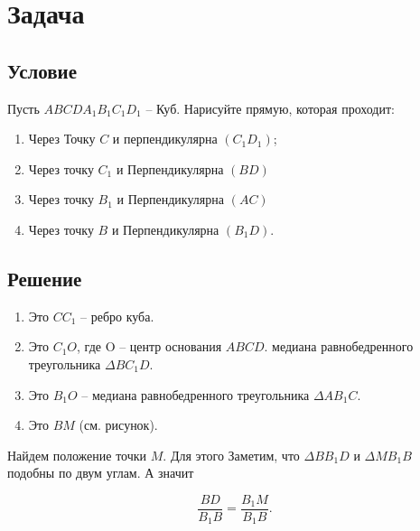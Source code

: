 



\section*{Задача}

\subsection*{Условие}
Пусть $ABCDA_1B_1C_1D_1$ -- Куб. Нарисуйте прямую, которая проходит:

\begin{enumerate}

\item Через Точку $C$ и перпендикулярна $(C_1D_1)$;

\item Через точку $C_1$ и Перпендикулярна $(BD)$

\item Через точку $B_1$ и Перпендикулярна $(AC)$

\item Через точку $B$ и Перпендикулярна $(B_1D)$.

\end{enumerate}
\subsection*{Решение}
\begin{enumerate}

\item Это $CC_1$ -- ребро куба.

\item Это $C_1O$, где O -- центр основания $ABCD$. медиана равнобедренного треугольника $\Delta BC_1D$.

\item Это $B_1O$ -- медиана равнобедренного треугольника $\Delta AB_1C$.

\item Это $BM$ (см. рисунок).

\end{enumerate}

\vspace{0.5 cm}

 Найдем положение точки $M$. Для этого Заметим, что $\Delta BB_1D$ и $\Delta MB_1B$ подобны по двум углам. А значит

\begin{equation}
	\frac{BD}{B_1B} = \frac{B_1M}{B_1B}.
\end{equation}

